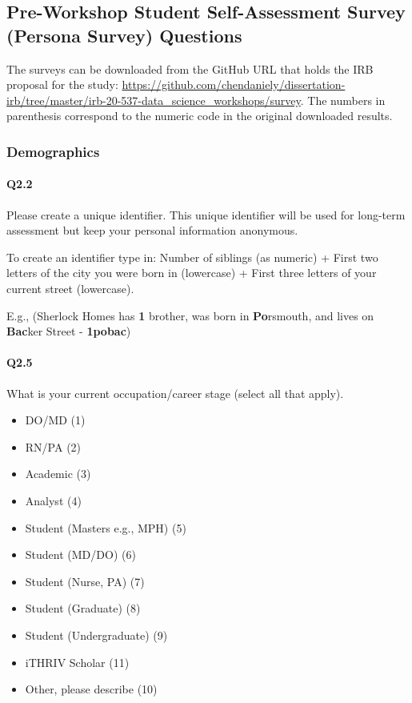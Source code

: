 \documentclass[020-persona\_validation.tex]{subfiles}
\begin{document}
\subsection{Pre-Workshop Student Self-Assessment Survey (Persona Survey) Questions}
\label{sse:persona-survey-questions}

The surveys can be downloaded from the GitHub URL that holds the IRB proposal for the study:
\url{https://github.com/chendaniely/dissertation-irb/tree/master/irb-20-537-data\_science_workshops/survey}.
The numbers in parenthesis correspond to the numeric code in the original downloaded results.

    \subsubsection{Demographics}

        \paragraph{Q2.2}

            Please create a unique identifier.
            This unique identifier will be used for long-term assessment but keep your personal information anonymous.

            To create an identifier type in:
            Number of siblings (as numeric) +
            First two letters of the city you were born in (lowercase) +
            First three letters of your current street (lowercase).

            E.g., (Sherlock Homes has \textbf{1} brother,
                was born in \textbf{Po}rsmouth,
                and lives on \textbf{Bac}ker Street - \textbf{1pobac})

        \paragraph{Q2.5}

            What is your current occupation/career stage (select all that apply).

            \begin{itemize}
                \item DO/MD  (1)
                \item RN/PA  (2)
                \item Academic  (3)
                \item Analyst  (4)
                \item Student (Masters e.g., MPH)  (5)
                \item Student (MD/DO)  (6)
                \item Student (Nurse, PA)  (7)
                \item Student (Graduate)  (8)
                \item Student (Undergraduate)  (9)
                \item iTHRIV Scholar  (11)
                \item Other, please describe  (10)
            \end{itemize}
\end{document}

